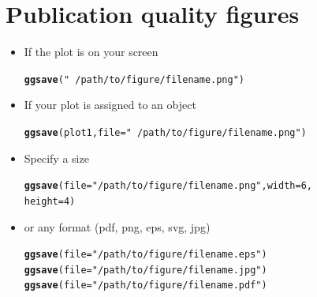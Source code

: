 \documentclass{beamer}\usepackage[]{graphicx}\usepackage[]{color}
\makeatletter
\newcommand{\hlstr}[1]{\textcolor[rgb]{0.192,0.494,0.8}{#1}}%
\newcommand{\hlkwd}[1]{\textcolor[rgb]{0.737,0.353,0.396}{\textbf{#1}}}%
\newenvironment{kframe}{%
 \def\at@end@of@kframe{}%
 \ifinner\ifhmode%
  \def\at@end@of@kframe{\end{minipage}}%
  \begin{minipage}{\columnwidth}%
 \fi\fi%
 \def\FrameCommand##1{\hskip\@totalleftmargin \hskip-\fboxsep
 \colorbox{shadecolor}{##1}\hskip-\fboxsep
     \hskip-\linewidth \hskip-\@totalleftmargin \hskip\columnwidth}%
 \MakeFramed {\advance\hsize-\width
   \@totalleftmargin\z@ \linewidth\hsize
   \@setminipage}}%
 {\par\unskip\endMakeFramed%
 \at@end@of@kframe}
\newenvironment{knitrout}{}{} %
\makeatother
\begin{document}


\section*{Publication quality figures}
\frame{\sectionpage}



\begin{frame}[fragile]
\begin{itemize}
\item If the plot is on your screen
\begin{knitrout}\footnotesize
{}\color{fgcolor}\begin{kframe}
\begin{alltt}
\hlkwd{ggsave}(\hlstr{"~/path/to/figure/filename.png"})
\end{alltt}
\end{kframe}
\end{knitrout}

\item If your plot is assigned to an object
\begin{knitrout}\footnotesize
{}\color{fgcolor}\begin{kframe}
\begin{alltt}
\hlkwd{ggsave}(plot1, file = \hlstr{"~/path/to/figure/filename.png"})
\end{alltt}
\end{kframe}
\end{knitrout}


\item Specify a size
\begin{knitrout}\footnotesize
{}\color{fgcolor}\begin{kframe}
\begin{alltt}
\hlkwd{ggsave}(file = \hlstr{"/path/to/figure/filename.png"}, width = 6,
height =4)
\end{alltt}
\end{kframe}
\end{knitrout}

\item or any format (pdf, png, eps, svg, jpg)
\begin{knitrout}\footnotesize
{}\color{fgcolor}\begin{kframe}
\begin{alltt}
\hlkwd{ggsave}(file = \hlstr{"/path/to/figure/filename.eps"})
\hlkwd{ggsave}(file = \hlstr{"/path/to/figure/filename.jpg"})
\hlkwd{ggsave}(file = \hlstr{"/path/to/figure/filename.pdf"})
\end{alltt}
\end{kframe}
\end{knitrout}


\end{itemize}
\end{frame}
\end{document}
